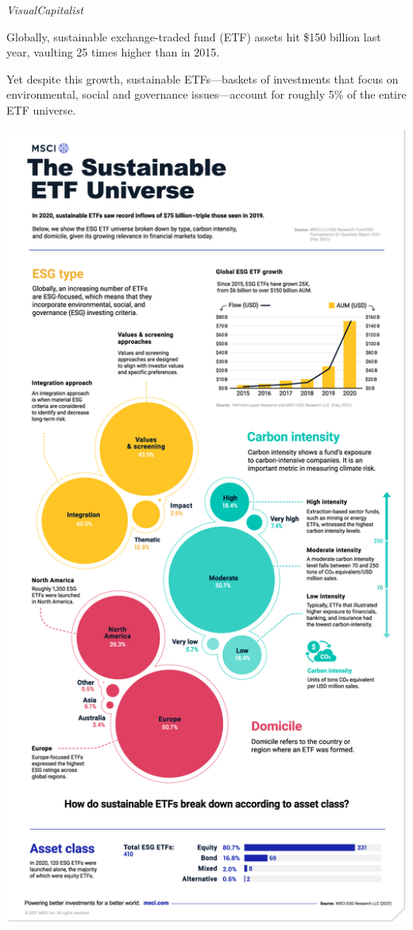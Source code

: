 \documentclass[
]{book}
\begin{document}
\emph{VisualCapitalist}

Globally, sustainable exchange-traded fund (ETF) assets hit \$150 billion last year, vaulting 25 times higher than in 2015.

Yet despite this growth, sustainable ETFs---baskets of investments that focus on environmental, social and governance issues---account for roughly 5\% of the entire ETF universe.

\includegraphics{fig/MSCI_Sustainable-Universe_210518.jpg}
\end{document}
